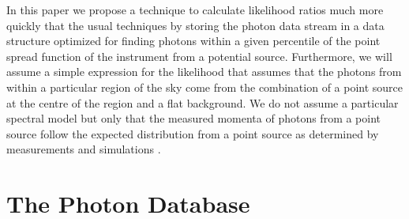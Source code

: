 \documentclass[useAMS,usenatbib]{mn2e}
\begin{document}
In this paper we propose a technique to calculate likelihood ratios
much more quickly that the usual techniques by storing the photon data
stream in a data structure optimized for finding photons within a
given percentile of the point spread function of the instrument from a
potential source.  Furthermore, we will assume a simple expression for
the likelihood that assumes that the photons from within a particular
region of the sky come from the combination of a point source at the
centre of the region and a flat background.
We do not assume a particular spectral model but only that the
measured momenta of photons from a point source follow the expected
distribution from a point source as determined by measurements and
simulations \citep{2013ApJ...765...54A}.

\section{The Photon Database}
\label{sec:photon-database}
\end{document}
